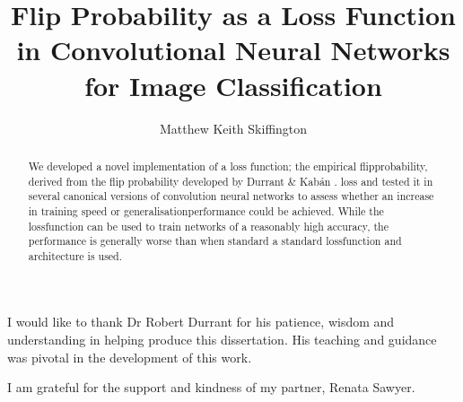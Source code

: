 \documentclass[12pt]{uwthesis17}
\title{Flip Probability as a Loss Function in Convolutional Neural Networks for Image Classification}
\author{Matthew Keith Skiffington}
\begin{document}
\maketitle
\setcounter{page}{2}

\setlength{\parindent}{0pt} %

\begin{abstract}

We developed a novel implementation of a \gls{loss} function; the empirical \gls{flipprobability}, derived from the flip probability developed by Durrant \& Kab\'an \cite{durrant2013sharp}. \gls{loss} and tested it in several canonical versions of convolution neural networks to assess whether an increase in training speed or \gls{generalisationperformance} could be achieved. While the \gls{lossfunction} can be used to train networks of a reasonably high accuracy, the performance is generally worse than when standard a standard \gls{lossfunction} and architecture is used. 

\end{abstract}
\begin{acknowledgements}

\bigskip

\begin{spacing}{2}


I would like to thank Dr Robert Durrant for his patience, wisdom and understanding in helping produce this dissertation. His teaching and guidance was pivotal in the development of this work.
\bigskip

I am grateful for the support and kindness of my partner, Renata Sawyer.
\bigskip

\end{spacing}

\end{acknowledgements}
\tableofcontents
\listoffigures
\listoftables
\newpage
{}
\setcounter{page}{1}








\end{document}
